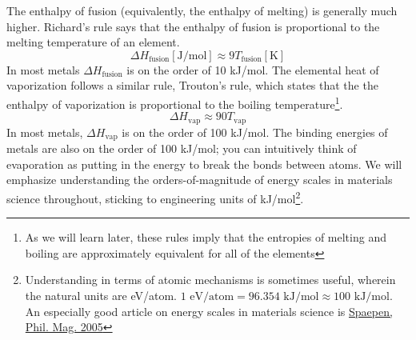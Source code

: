 \documentclass[12pt]{article}
\begin{document}
The enthalpy of fusion (equivalently, the enthalpy of melting) is generally much higher. Richard's rule says that the enthalpy of fusion is proportional to the melting temperature of an element. 
%
\begin{equation}
\Delta H_\text{fusion} [\text{J/mol}] \approx 9 T_\text{fusion} [\text{K}]
\end{equation}
In most metals $\Delta H_\text{fusion}$ is on the order of 10 kJ/mol.  The elemental heat of vaporization follows a similar rule, Trouton's rule, which states that the the enthalpy of vaporization is proportional to the boiling temperature\footnote{As we will learn later, these rules imply that the entropies of melting and boiling are approximately equivalent for all of the elements}.
\begin{equation}
\Delta H_\text{vap} \approx 90 T_\text{vap}
\end{equation}
In most metals,  $\Delta H_\text{vap}$ is on the order of 100 kJ/mol.  The binding energies of metals are also on the order of 100 kJ/mol; you can intuitively think of evaporation as putting in the energy to break the bonds between atoms. We will emphasize understanding the orders-of-magnitude of energy scales in materials science throughout, sticking to engineering units of kJ/mol\footnote{Understanding in terms of atomic mechanisms is sometimes useful, wherein the natural units are eV/atom. $1 \text{ eV/atom}= 96.354\text{ kJ/mol}\approx 100\text{ kJ/mol}$. An especially good article on energy scales in materials science is  \href{http://dx.doi.org/10.1080/14786430500155080}{Spaepen, Phil. Mag. 2005}}.
\end{document}
